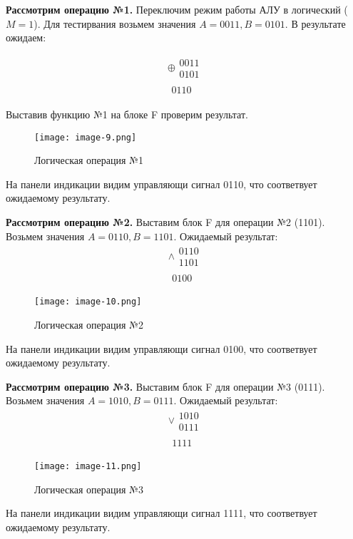 \textbf{Рассмотрим операцию №1.} Переключим режим работы АЛУ в логический ($M=1$).
Для тестирвания возьмем значения $A=0011,B=0101$. В результате ожидаем:

$$
    \begin{array}{r}
        \oplus
        \begin{array}{r}
            0011 \\
            0101
        \end{array} \\
        \hline
        \begin{array}{r}
            0110
        \end{array}
    \end{array}
$$

Выставив функцию №1 на блоке F проверим результат.
\begin{figure}[h]
    \centering
    \texttt{[image: image-9.png]}
    \caption{Логическая операция №1}
    \label{image:9}
\end{figure}

На панели индикации видим управляющи сигнал 0110, что соответвует ожидаемому результату. \par

\newpage
\textbf{Рассмотрим операцию №2.} Выставим блок F для операции №2 (1101).
Возьмем значения $A=0110,B=1101$. Ожидаемый результат:
$$
    \begin{array}{r}
        \wedge
        \begin{array}{r}
            0110 \\
            1101
        \end{array} \\
        \hline
        \begin{array}{r}
            0100
        \end{array}
    \end{array}
$$

\begin{figure}[h]
    \centering
    \texttt{[image: image-10.png]}
    \caption{Логическая операция №2}
    \label{image:10}
\end{figure}

На панели индикации видим управляющи сигнал 0100, что соответвует ожидаемому результату. \par

\textbf{Рассмотрим операцию №3.} Выставим блок F для операции №3 (0111).
Возьмем значения $A=1010,B=0111$. Ожидаемый результат:
$$
    \begin{array}{r}
        \vee
        \begin{array}{r}
            1010 \\
            0111
        \end{array} \\
        \hline
        \begin{array}{r}
            1111
        \end{array}
    \end{array}
$$

\begin{figure}[h]
    \centering
    \texttt{[image: image-11.png]}
    \caption{Логическая операция №3}
    \label{image:11}
\end{figure}

На панели индикации видим управляющи сигнал 1111, что соответвует ожидаемому результату. \par

\newpage